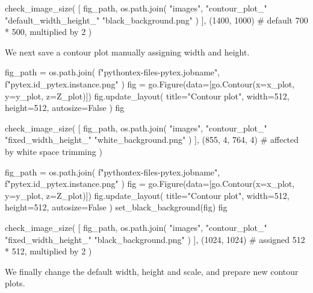 \documentclass[oneside]{book}
\begin{document}
\begin{pycell}
check_image_size(
    [
        fig_path,
        os.path.join(
            "images",
            "contour_plot_"
            "default_width_height_"
            "black_background.png"
        )
    ],
    (1400, 1000)  # default 700 * 500, multiplied by 2
)
\end{pycell}

\begin{mdcell}
We next save a contour plot manually assigning width and height.
\end{mdcell}

\begin{pycell}
fig_path = os.path.join(
    f"pythontex-files-{pytex.jobname}",
    f"{pytex.id}_{pytex.instance}.png"
)
fig = go.Figure(data=[go.Contour(x=x_plot, y=y_plot, z=Z_plot)])
fig.update_layout(
    title="Contour plot", width=512, height=512, autosize=False
)
fig
\end{pycell}

\begin{pycell}
check_image_size(
    [
        fig_path,
        os.path.join(
            "images",
            "contour_plot_"
            "fixed_width_height_"
            "white_background.png"
        )
    ],
    (855, 4, 764, 4)  # affected by white space trimming
)
\end{pycell}

\begin{pycell}
fig_path = os.path.join(
    f"pythontex-files-{pytex.jobname}",
    f"{pytex.id}_{pytex.instance}.png"
)
fig = go.Figure(data=[go.Contour(x=x_plot, y=y_plot, z=Z_plot)])
fig.update_layout(
    title="Contour plot", width=512, height=512, autosize=False
)
set_black_background(fig)
fig
\end{pycell}

\begin{pycell}
check_image_size(
    [
        fig_path,
        os.path.join(
            "images",
            "contour_plot_"
            "fixed_width_height_"
            "black_background.png"
        )
    ],
    (1024, 1024)  # assigned 512 * 512, multiplied by 2
)
\end{pycell}

\begin{mdcell}
We finally change the default width, height and scale, and prepare new contour plots.
\end{mdcell}
\end{document}
